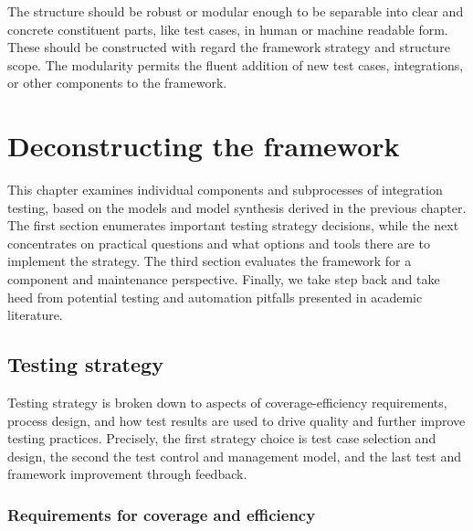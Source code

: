 \documentclass[12pt,a4paper,oneside,pdftex]{report}
\begin{document}
The structure should be robust or modular enough to be separable into clear and concrete constituent parts, like test cases, in human or machine readable form. These should be constructed with regard the framework strategy and structure scope. The modularity permits the fluent addition of new test cases, integrations, or other components to the framework.

\begin{comment}
The testing process can vary in its mode of execution or degree of automation. In what is perhaps the most extreme case, test case are run automatically every time a change is committed to system source code. This approach is called continuous integration (CI). 
\end{comment}



\chapter{Deconstructing the framework}
\label{chapter:frameworkanalysis}

This chapter examines individual components and subprocesses of integration testing, based on the models and model synthesis derived in the previous chapter. The first section enumerates important testing strategy decisions, while the next concentrates on practical questions and what options and tools there are to implement the strategy. The third section evaluates the framework for a component and maintenance perspective. Finally, we take step back and take heed from potential testing and automation pitfalls presented in academic literature. 

\section{Testing strategy}

Testing strategy is broken down to aspects of coverage-efficiency requirements, process design, and how test results are used to drive quality and further improve testing practices. Precisely, the first strategy choice is test case selection and design, the second the test control and management model, and the last test and framework improvement through feedback. %

\subsection{Requirements for coverage and efficiency}
\end{document}
